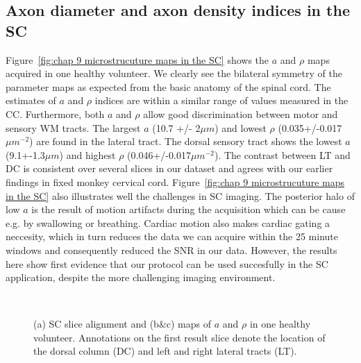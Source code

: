 \subsection*{Axon diameter and axon density indices in the SC}
Figure~\ref{fig:chap 9 microstrucuture maps in the SC} shows the $a$ and $\rho$ maps acquired in one healthy volunteer. We clearly see the bilateral symmetry of the parameter maps as expected from the basic anatomy of the spinal cord. The estimates of $a$ and $\rho$ indices are within a similar range of values measured in the CC. Furthermore, both $a$ and $\rho$ allow good discrimination between motor and sensory WM tracts. The largest $a$ (10.7 +/- 2$\mu m$) and lowest $\rho$ (0.035+/-0.017$\mu m^{-2}$) are found in the lateral tract. The dorsal sensory tract shows the lowest $a$ (9.1+-1.3$\mu m$) and highest $\rho$ (0.046+/-0.017$\mu m^{-2}$). The contrast between LT and DC is consistent over several slices in our dataset and agrees with our earlier findings in fixed monkey cervical cord. Figure~\ref{fig:chap 9 microstrucuture maps in the SC} also illustrates well the challenges in SC imaging. The posterior halo of low $a$ is the result of motion artifacts during the acquisition which can be cause e.g. by swallowing or breathing. Cardiac motion also makes cardiac gating a neccesity, which in turn reduces the data we can acquire within the 25 minute windows and consequently reduced the SNR in our data. However, the results here show first evidence that our \SFasym{} protocol can be used succesfully in the SC application, despite the more challenging imaging environment.
\begin{figure}[ht]
	\centering
	\begin{minipage}{0.39\textwidth}
	\end{minipage}
	\begin{minipage}{0.59\textwidth}
			\\
	\end{minipage}
	\caption{(a) SC slice alignment  and  (b\&c) maps of $a$ and $\rho$ in one healthy volunteer. Annotations on the first result slice denote the location of the dorsal column (DC) and left and right lateral tracts (LT).}
	\label{fig:chap9 scan rescan maps per subject}
\end{figure}

